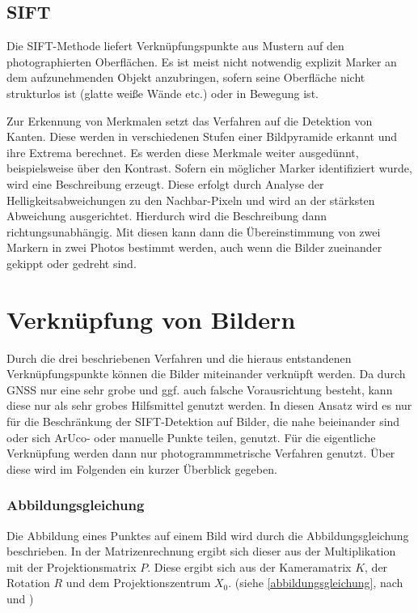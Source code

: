 \documentclass[a4paper,12pt,bibliography=totoc, listof=totoc,titlepage]{scrreprt}
\begin{document}
\subsection{SIFT}
Die SIFT-Methode liefert Verknüpfungspunkte aus Mustern auf den photographierten Oberflächen. Es ist meist nicht notwendig explizit Marker an dem aufzunehmenden Objekt anzubringen, sofern seine Oberfläche nicht strukturlos ist (glatte weiße Wände etc.) oder in Bewegung ist.

Zur Erkennung von Merkmalen setzt das Verfahren auf die Detektion von Kanten. Diese werden in verschiedenen Stufen einer Bildpyramide erkannt und ihre Extrema berechnet. Es werden diese Merkmale weiter ausgedünnt, beispielsweise über den Kontrast. Sofern ein möglicher Marker identifiziert wurde, wird eine Beschreibung erzeugt. Diese erfolgt  durch Analyse der Helligkeitsabweichungen zu den Nachbar-Pixeln und wird an der stärksten Abweichung ausgerichtet. Hierdurch wird die Beschreibung dann richtungsunabhängig. Mit diesen kann dann die Übereinstimmung von zwei Markern in zwei Photos bestimmt werden, auch wenn die Bilder zueinander gekippt oder gedreht sind.
\citep[S. 483]{luhmann4}

\section{Verknüpfung von Bildern}
\label{s:photogramm}
Durch die drei beschriebenen Verfahren und die hieraus entstandenen Verknüpfungs\-punkte können die Bilder miteinander verknüpft werden. Da durch GNSS nur eine sehr grobe und ggf. auch falsche Vorausrichtung besteht, kann diese nur als sehr grobes Hilfsmittel genutzt werden. In diesen Ansatz wird es nur für die Beschränkung der SIFT-Detektion auf Bilder, die nahe beieinander sind oder sich ArUco- oder manuelle Punkte teilen, genutzt.
Für die eigentliche Verknüpfung werden dann nur photogrammmetrische Verfahren genutzt. Über diese wird im Folgenden ein kurzer Überblick gegeben.

\subsubsection{Abbildungsgleichung}
\label{ss:abbildungsgleichung}
Die Abbildung eines Punktes auf einem Bild wird durch die Abbildungsgleichung beschrieben. In der Matrizenrechnung ergibt sich dieser aus der Multiplikation mit der Projektionsmatrix $P$. Diese ergibt sich aus der Kameramatrix $K$, der Rotation $R$ und dem Projektionszentrum $X_0$. (siehe \autoref{abbildungsgleichung}, nach \citealp[S. 244]{hartley} und \citealp[S. 288]{luhmann4})
\end{document}

